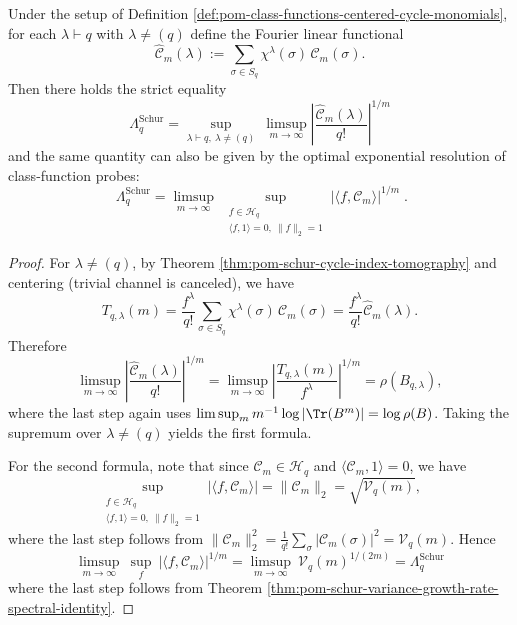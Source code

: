 \begin{theorem}\label{thm:pom-schur-envelope-variational-characterization}
Under the setup of Definition \ref{def:pom-class-functions-centered-cycle-monomials}, for each \(\lambda\vdash q\) with \(\lambda\neq(q)\) define the Fourier linear functional
\[
\widehat{\mathcal C}_m(\lambda):=\sum_{\sigma\in S_q}\chi^\lambda(\sigma)\,\mathcal C_m(\sigma).
\]
Then there holds the strict equality
\[
\boxed{\;
\Lambda_q^{\mathrm{Schur}}
=
\sup_{\lambda\vdash q,\ \lambda\neq(q)}\ \limsup_{m\to\infty}\left|\frac{\widehat{\mathcal C}_m(\lambda)}{q!}\right|^{1/m}\;}
\]
and the same quantity can also be given by the optimal exponential resolution of class-function probes:
\[
\boxed{\;
\Lambda_q^{\mathrm{Schur}}
=
\limsup_{m\to\infty}\ \sup_{\substack{f\in\mathcal H_q\\ \langle f,1\rangle=0,\ \|f\|_2=1}}
\left|\langle f,\mathcal C_m\rangle\right|^{1/m}\; } .
\]
\end{theorem}
\begin{proof}
For \(\lambda\neq(q)\), by Theorem \ref{thm:pom-schur-cycle-index-tomography} and centering (trivial channel is canceled), we have
\[
T_{q,\lambda}(m)
=\frac{f^\lambda}{q!}\sum_{\sigma\in S_q}\chi^\lambda(\sigma)\,\mathcal C_m(\sigma)
=\frac{f^\lambda}{q!}\widehat{\mathcal C}_m(\lambda).
\]
Therefore
\[
\limsup_{m\to\infty}\left|\frac{\widehat{\mathcal C}_m(\lambda)}{q!}\right|^{1/m}
=
\limsup_{m\to\infty}\left|\frac{T_{q,\lambda}(m)}{f^\lambda}\right|^{1/m}
=
\rho(B_{q,\lambda}),
\]
where the last step again uses \(\limsup_m m^{-1}\log|\Tr(B^m)|=\log\rho(B)\).
Taking the supremum over \(\lambda\neq(q)\) yields the first formula.
\par
For the second formula, note that since \(\mathcal C_m\in\mathcal H_q\) and \(\langle \mathcal C_m,1\rangle=0\), we have
\[
\sup_{\substack{f\in\mathcal H_q\\ \langle f,1\rangle=0,\ \|f\|_2=1}}
|\langle f,\mathcal C_m\rangle|
=\|\mathcal C_m\|_2
=\sqrt{\mathcal V_q(m)},
\]
where the last step follows from \(\|\mathcal C_m\|_2^2=\frac1{q!}\sum_\sigma|\mathcal C_m(\sigma)|^2=\mathcal V_q(m)\).
Hence
\[
\limsup_{m\to\infty}\ \sup_{f}\ |\langle f,\mathcal C_m\rangle|^{1/m}
=\limsup_{m\to\infty}\ \mathcal V_q(m)^{1/(2m)}
=\Lambda_q^{\mathrm{Schur}}
\]
where the last step follows from Theorem \ref{thm:pom-schur-variance-growth-rate-spectral-identity}.
\end{proof}

\endinput
